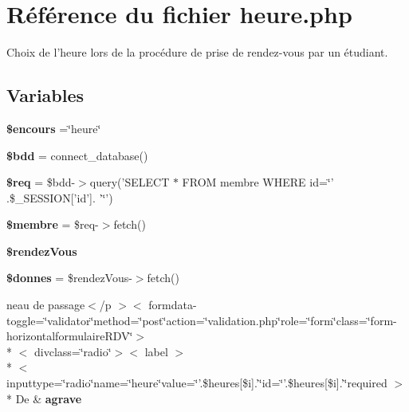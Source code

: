 \hypertarget{heure_8php}{\section{Référence du fichier heure.\-php}
\label{heure_8php}
}


Choix de l'heure lors de la procédure de prise de rendez-\/vous par un étudiant.  


\subsection*{Variables}
\begin{DoxyCompactItemize}
\item 
\hypertarget{heure_8php_af7b0e56292699e6983c24fbbf70ce08d}{{\bfseries \$encours} =\char`\"{}heure\char`\"{}}\label{heure_8php_af7b0e56292699e6983c24fbbf70ce08d}

\item 
\hypertarget{heure_8php_a94f91e878bce0991e2cd595c5dd79b3f}{{\bfseries \$bdd} = connect\-\_\-database()}\label{heure_8php_a94f91e878bce0991e2cd595c5dd79b3f}

\item 
\hypertarget{heure_8php_a63a7a283ea5dee8af1e2d5a3435bf370}{{\bfseries \$req} = \$bdd-\/$>$query('S\-E\-L\-E\-C\-T $\ast$ F\-R\-O\-M membre W\-H\-E\-R\-E id=\char`\"{}' .\$\-\_\-\-S\-E\-S\-S\-I\-O\-N\mbox{[}'id'\mbox{]}. '\char`\"{}')}\label{heure_8php_a63a7a283ea5dee8af1e2d5a3435bf370}

\item 
\hypertarget{heure_8php_aa000a46a528298c316b1fdf788402a63}{{\bfseries \$membre} = \$req-\/$>$fetch()}\label{heure_8php_aa000a46a528298c316b1fdf788402a63}

\item 
{\bfseries \$rendez\-Vous}
\item 
\hypertarget{heure_8php_a93720f3d7a3eb4aabe4bb2053895b6b6}{{\bfseries \$donnes} = \$rendez\-Vous-\/$>$fetch()}\label{heure_8php_a93720f3d7a3eb4aabe4bb2053895b6b6}

\item 
\hypertarget{heure_8php_a93bba7b1cd7e64470e2f407c224a445f}{neau de passage$<$/p $>$$<$ formdata-\/toggle=\char`\"{}validator\char`\"{}method=\char`\"{}post\char`\"{}action=\char`\"{}validation.\-php\char`\"{}role=\char`\"{}form\char`\"{}class=\char`\"{}form-\/horizontalformulaire\-R\-D\-V\char`\"{}$>$\\*
$<$ divclass=\char`\"{}radio\char`\"{}$>$$<$ label $>$\\*
$<$ inputtype=\char`\"{}radio\char`\"{}name=\char`\"{}heure\char`\"{}value=\char`\"{}'.\$heures\mbox{[}\$i\mbox{]}.'\char`\"{}id=\char`\"{}'.\$heures\mbox{[}\$i\mbox{]}.'\char`\"{}required $>$\\*
 De \& {\bfseries agrave}}\label{heure_8php_a93bba7b1cd7e64470e2f407c224a445f}


\end{DoxyCompactItemize}

